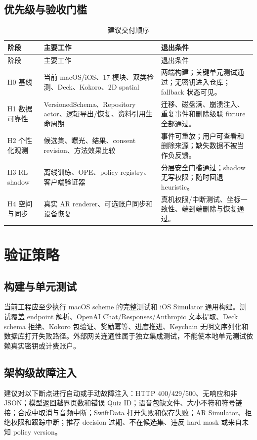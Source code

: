 \documentclass[11pt,a4paper,fontset=none]{ctexart}
\begin{document}
\subsection{优先级与验收门槛}
\begin{longtable}{P{18mm}P{47mm}P{76mm}}
\caption{建议交付顺序}\label{tab:roadmap}\\
\toprule
阶段 & 主要工作 & 退出条件 \\
\midrule
\endfirsthead
\toprule
阶段 & 主要工作 & 退出条件 \\
\midrule
\endhead
H0 基线 & 当前 macOS/iOS、17 模块、双类检测、Deck、Kokoro、2D spatial & 两端构建；关键单元测试通过；无密钥进入仓库；fallback 状态可见。 \\
H1 数据可靠性 & VersionedSchema、Repository actor、逻辑导出/恢复、资料引用生命周期 & 迁移、磁盘满、崩溃注入、重复事件和删除级联 fixture 全部通过。 \\
H2 个性化观测 & 候选集、曝光、结果、consent revision、方法效果比较 & 事件可重放；用户可查看和删除来源；缺失数据不被当作负反馈。 \\
H3 RL shadow & 离线训练、OPE、policy registry、客户端验证器 & 分层安全门槛通过；shadow 无写权限；随时回退 heuristic。 \\
H4 空间与同步 & 真实 AR renderer、可选账户同步和设备恢复 & 真机权限/中断测试、坐标一致性、端到端删除与恢复通过。 \\
\bottomrule
\end{longtable}

\section{验证策略}

\subsection{构建与单元测试}
当前工程应至少执行 macOS scheme 的完整测试和 iOS Simulator 通用构建。测试覆盖 endpoint 解析、OpenAI Chat/Responses/Anthropic 文本提取、Deck schema 拒绝、Kokoro 包验证、奖励幂等、进度推进、Keychain 无明文序列化和数据库打开失败路径。外部网关连通性属于独立集成测试，不能使本地单元测试依赖真实密钥或计费账户。

\subsection{架构级故障注入}
建议对以下断点进行自动或手动故障注入：HTTP 400/429/500、无响应和非 JSON；模型返回越界页数和错误 Quiz ID；语音包缺文件、大小不符和符号链接；合成中取消与音频中断；SwiftData 打开失败和保存失败；AR Simulator、拒绝权限和跟踪中断；推荐 decision 过期、不在候选集、违反 hard mask 或来自未知 policy version。
\end{document}

